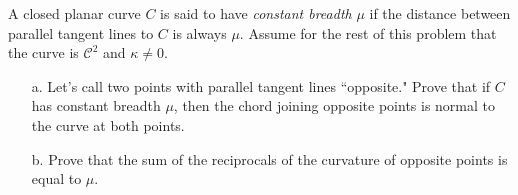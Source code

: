 \documentclass[Shifrin_Solutions_Spring_2018]{subfiles}
\begin{document}
\vspace{.5cm}


\begin{exercise}
A closed planar curve $C$ is said to have \emph{constant breadth} $\mu$ if the distance between parallel tangent lines to $C$ is always $\mu$. Assume for the rest of this problem that the curve is $\mathcal{C}^2$ and $\kappa\neq 0$.
\begin{itemize}
\item[a.] Let's call two points with parallel tangent lines ``opposite." Prove that if $C$ has constant breadth $\mu$, then the chord joining opposite points is normal to the curve at both points.
\item[b.] Prove that the sum of the reciprocals of the curvature of opposite points is equal to $\mu$.
\end{itemize}
\end{exercise}
\end{document}
